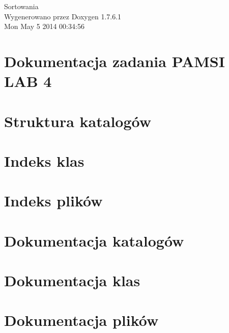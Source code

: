\documentclass[a4paper]{book}
\begin{document}
\hypersetup{pageanchor=false,citecolor=blue}
\begin{titlepage}
\vspace*{7cm}
\begin{center}
{\Large \-Sortowania }\\
\vspace*{1cm}
{\large \-Wygenerowano przez Doxygen 1.7.6.1}\\
\vspace*{0.5cm}
{\small Mon May 5 2014 00:34:56}\\
\end{center}
\end{titlepage}
\clearemptydoublepage
{}
\tableofcontents
\clearemptydoublepage
{}
\hypersetup{pageanchor=true,citecolor=blue}
\chapter{\-Dokumentacja zadania \-P\-A\-M\-S\-I \-L\-A\-B 4}
\label{index}\hypertarget{index}{}
\chapter{\-Struktura katalogów}

\chapter{\-Indeks klas}

\chapter{\-Indeks plików}

\chapter{\-Dokumentacja katalogów}



\chapter{\-Dokumentacja klas}


\chapter{\-Dokumentacja plików}





\printindex
\end{document}
